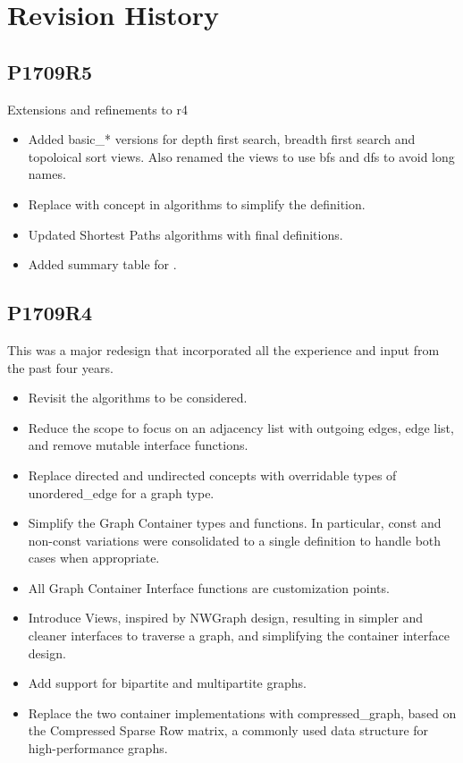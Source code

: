 \chapter*{Revision History}
\section*{P1709R5}
Extensions and refinements to r4
\begin{itemize}
\item Added basic\_* versions for depth first search, breadth first search and topoloical sort views. Also renamed the views to use bfs and dfs to avoid long names.
\item Replace  with  concept in algorithms to simplify the definition.
\item Updated Shortest Paths algorithms with final definitions.
\item Added summary table for .
\end{itemize}

\section*{P1709R4}
This was a major redesign that incorporated all the experience and input from the past four years.
\begin{itemize}
\item Revisit the algorithms to be considered.
\item Reduce the scope to focus on an adjacency list with outgoing edges, edge list, and remove mutable interface functions. 
\item Replace directed and undirected concepts with overridable types of unordered\_edge for a graph type.
\item Simplify the Graph Container types and functions. In particular, const and non-const variations were consolidated to a single definition to handle both cases 
when appropriate.
\item All Graph Container Interface functions are customization points.
\item Introduce Views, inspired by NWGraph design, resulting in simpler and cleaner interfaces to traverse a graph, and simplifying the container interface design.
\item Add support for bipartite and multipartite graphs.
\item Replace the two container implementations with compressed\_graph, based on the Compressed Sparse Row matrix, a commonly used 
      data structure for high-performance graphs.
\end{itemize}

